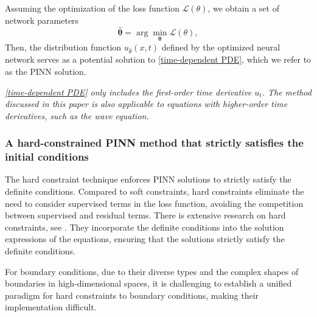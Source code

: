 \documentclass[preprint]{elsarticle}
\numberwithin{table}{section}
\numberwithin{equation}{section}
\numberwithin{figure}{section}
\begin{document}
\begin{CJK}{UTF8}{gbsn}
  Assuming the optimization of the loss function $\mathcal{L}(\theta)$, we obtain a set of network parameters \begin{equation}
 \hat{{\boldsymbol{\theta}}} = \arg\min_{{\boldsymbol{\theta}}} \mathcal{L}(\theta), 
\end{equation}
Then, the distribution function  
$u_{\hat\theta}(x,t)$ defined by the optimized neural network serves as a  potential  solution to   \eqref{time-dependent PDE}, which we refer to as the PINN solution.
 

\textit{ \eqref{time-dependent PDE} only includes the first-order time derivative $u_t$. The method discussed in this paper is also applicable to equations with higher-order time derivatives, such as the wave equation.}

 

\subsubsection{A hard-constrained PINN method that strictly satisfies the initial conditions}

 

The hard constraint technique enforces PINN solutions to strictly satisfy the  {definite}    conditions. Compared to  soft constraints, hard constraints eliminate the need to consider supervised terms in the loss function, avoiding the  {competition}   between supervised and residual terms. There is extensive research on hard constraints, see \cite{712178,article,Projection,Exact,PhyCRNet}. They incorporate the  {definite}  conditions 
into   the solution expressions of the equations, ensuring that the solutions strictly satisfy  the {definite}  conditions. 

 

For boundary conditions, due to their diverse types and the complex shapes of boundaries in high-dimensional spaces, it is challenging to establish a unified paradigm for  hard constraints to boundary conditions, making their implementation difficult.



\end{CJK}
\end{document}
